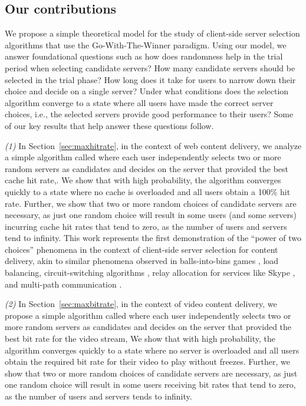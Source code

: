 \documentclass[conference]{IEEEtran}
\begin{document}
\subsection{Our contributions}
 We propose a simple theoretical model for the study of client-side server selection algorithms that use the  Go-With-The-Winner paradigm. Using our model, we answer foundational questions such as how does randomness help in the trial period when selecting candidate servers? How many candidate servers should be selected in the trial phase? How long does it take for users to narrow down their choice and decide on a single server? Under what conditions does the selection algorithm converge to a state where all users have made the correct server choices, i.e., the selected servers provide good performance to their users? Some of our key results that help answer these questions follow.

{\em (1)}  In Section~\ref{sec:maxhitrate}, in the context of web content delivery, we analyze a simple algorithm called  where each user independently selects two or more random servers as candidates and decides on the server that provided the best cache hit rate,. We show that with high probability, the algorithm converges quickly to a state where no cache is overloaded and all users obtain a 100\% hit rate. Further, we show that  two or more random choices of candidate servers are necessary, as just one random choice will result in some users (and some servers) incurring cache hit rates that tend to zero, as the number of users and servers tend to infinity. This work represents the first demonstration of the ``power of two choices''  phenomena in the context of client-side server selection for content delivery,  akin to similar phenomena observed in balls-into-bins games \cite{mitzenmacherRS2001}, load balancing,  circuit-switching algorithms \cite{cole1998randomized}, relay allocation for services like Skype \cite{Nguyen:2008}, and multi-path communication \cite{Peter:2007}. 

{\em (2)}   In Section~\ref{sec:maxbitrate}, in the context of video content delivery, we propose a simple algorithm called  where each user independently selects two or more random servers as candidates and decides on the server that provided the best bit rate for the video stream,  We show that with high probability, the algorithm converges quickly to a state where no server is overloaded and all users obtain the required bit rate for their video to play without freezes. Further, we show that two or more random choices of candidate servers are necessary, as just one random choice will result in some users receiving bit rates that tend to zero, as the number of users and servers tends to infinity. 
\end{document}
